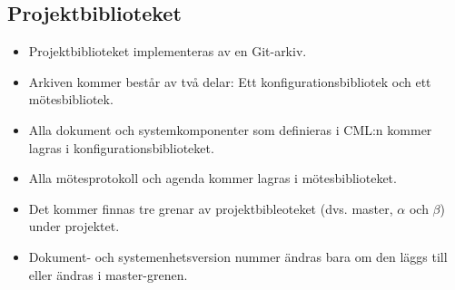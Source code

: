\documentclass[paper=a4, fontsize=11pt,twoside]{article}
\begin{document}
\subsection*{Projektbiblioteket}
\begin{itemize}
\item Projektbiblioteket implementeras av en Git-arkiv.
\item Arkiven kommer består av två delar: Ett konfigurationsbibliotek och ett mötesbibliotek.
\item Alla dokument och systemkomponenter som definieras i CML:n kommer lagras i konfigurationsbiblioteket.
\item Alla mötesprotokoll och agenda kommer lagras i mötesbiblioteket.
\item Det kommer finnas tre grenar av projektbibleoteket (dvs. master,
  $\alpha$ och $\beta$) under projektet.
\item Dokument- och systemenhetsversion nummer ändras bara om den läggs till
eller ändras i master-grenen.
\end{itemize}
\end{document}
